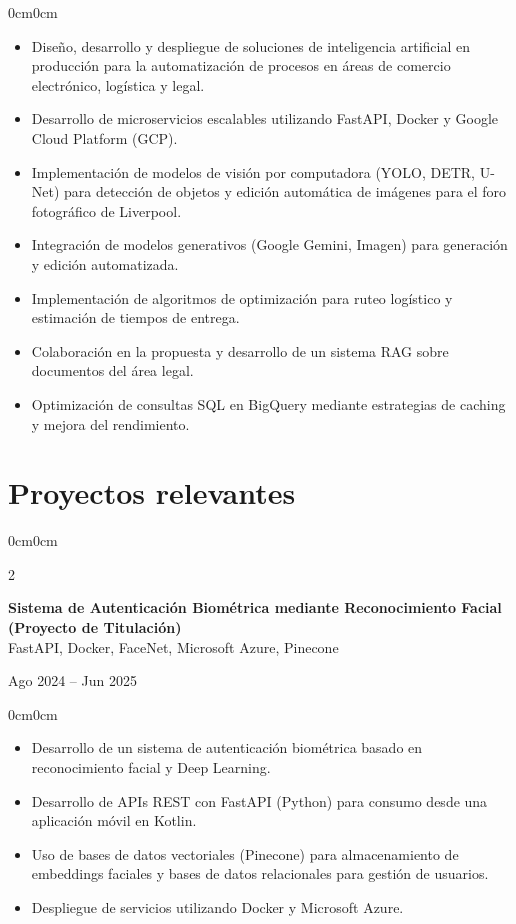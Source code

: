 \documentclass[10pt, letterpaper]{article}
\newenvironment{highlights}{
	\begin{itemize}[topsep=0.15cm,itemsep=0pt,leftmargin=10pt]
	}{
	\end{itemize}
}
\newenvironment{onecolentry}{
	\begin{adjustwidth}{0cm}{0cm}
	}{
	\end{adjustwidth}
	\vspace{0.02cm}
}
\newenvironment{twocolentry}[1]{
	\onecolentry
	\columnratio{0.75} 
	\begin{paracol}{2}
		\raggedright #1
		\switchcolumn
	}{
	\end{paracol}
	\endonecolentry
}
\begin{document}
	\begin{onecolentry}
		\begin{highlights}
			\item Diseño, desarrollo y despliegue de soluciones de inteligencia artificial en producción para la automatización de procesos en áreas de comercio electrónico, logística y legal.
			
			\item Desarrollo de microservicios escalables utilizando FastAPI, Docker y Google Cloud Platform (GCP).
			
			\item Implementación de modelos de visión por computadora (YOLO, DETR, U-Net) para detección de objetos y edición automática de imágenes para el foro fotográfico de Liverpool.
			
			\item Integración de modelos generativos (Google Gemini, Imagen) para generación y edición automatizada.
			
			\item Implementación de algoritmos de optimización para ruteo logístico y estimación de tiempos de entrega.
			
			\item Colaboración en la propuesta y desarrollo de un sistema RAG sobre documentos del área legal.
			
			\item Optimización de consultas SQL en BigQuery mediante estrategias de caching y mejora del rendimiento.
			
		\end{highlights}
	\end{onecolentry}
	
	\section{Proyectos relevantes}
	
	\begin{twocolentry}
		{\textbf{Sistema de Autenticación Biométrica mediante Reconocimiento Facial\\
			(Proyecto de Titulación)}\\
		FastAPI, Docker, FaceNet, Microsoft Azure, Pinecone}
		{Ago 2024 -- Jun 2025}
	\end{twocolentry}
	
	\begin{onecolentry}
		\begin{highlights}
			\item Desarrollo de un sistema de autenticación biométrica basado en reconocimiento facial y Deep Learning.
			\item Desarrollo de APIs REST con FastAPI (Python) para consumo desde una aplicación móvil en Kotlin.
			\item Uso de bases de datos vectoriales (Pinecone) para almacenamiento de embeddings faciales y bases de datos relacionales para gestión de usuarios.
			\item Despliegue de servicios utilizando Docker y Microsoft Azure.
		\end{highlights}
	\end{onecolentry}
	
\end{document}
